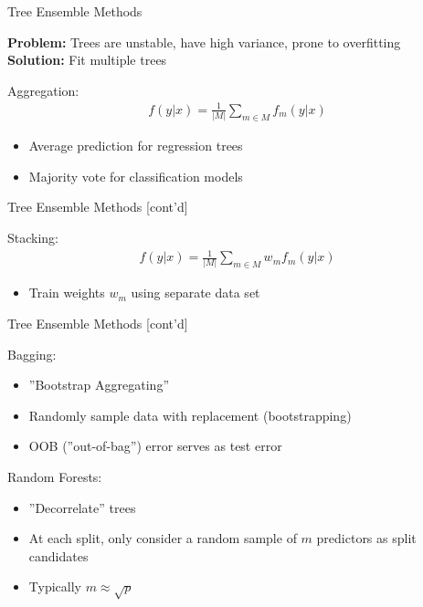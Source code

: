 \documentclass[ignorenonframetext,xcolor=x11names]{beamer}
\begin{document}
\begin{frame}{Tree Ensemble Methods}

\textbf{Problem:} Trees are unstable, have high variance, prone to overfitting \\

\textbf{Solution:} Fit multiple trees

\begin{block}{Aggregation:}
\begin{align*}
f(y | x) = \frac{1}{|M|} \sum_{m \in M} f_m(y|x)
\end{align*}
\begin{itemize}
   \item Average prediction for regression trees
   \item Majority vote for classification models
\end{itemize}
\end{block}
\end{frame}

\begin{frame}{Tree Ensemble Methods \small [cont'd]}
\begin{block}{Stacking:}
\begin{align*}
f(y | x) = \frac{1}{|M|} \sum_{m \in M} w_m f_m(y|x)
\end{align*}
\begin{itemize}
   \item Train weights $w_m$ using separate data set
\end{itemize}
\end{block}
\end{frame}

\begin{frame}{Tree Ensemble Methods \small [cont'd]}
\begin{block}{Bagging:}
\begin{itemize}
  \item ''Bootstrap Aggregating''
  \item Randomly sample data with replacement (bootstrapping)
  \item OOB (''out-of-bag'') error serves as test error
\end{itemize}
\end{block}

\begin{block}{Random Forests:}
\begin{itemize}
  \item ''Decorrelate'' trees
  \item At each split, only consider a random sample of $m$ predictors as split candidates
  \item Typically $m \approx \sqrt{p}$
\end{itemize}
\end{block}
\end{frame}
\end{document}
